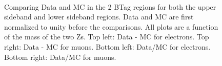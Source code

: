 \begin{figure}[htb!]
{\\
}
\caption{Comparing Data and MC in the 2 BTag regions for both the upper sideband and lower sideband regions. Data and MC are first normalized to unity before the comparisons. All plots are a function of the mass of the two Zs. Top left: Data - MC for electrons.  Top right: Data - MC for muons.  Bottom left: Data/MC for electrons.  Bottom right: Data/MC for muons.
\label{fig:2tag_sideband_up_down}}  
\end{figure}






